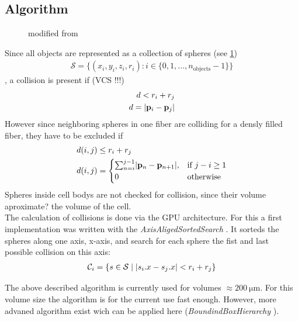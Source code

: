 \subsection{Algorithm}
% 
\begin{figure}[!t]
\centering
\def\tikzwidth{0.75\textwidth}
\caption{modified from \cite{Ginsburger2019}}
\label{fig:model:medusa_4}
\end{figure}
%
% 
Since all objects are represented as a collection of spheres (see \cref{fig:model:medusa_4})
\begin{align}
    \mathcal{S} = \{ (x_i,y_i,z_i,r_i) : i \in \{0, 1, ..., n_\text{objects}-1\}  \} 
\end{align}
% 
, a collision is present if (VCS !!!)
% 
\begin{align}
\begin{split}
d<r_i+r_j\\
d = \lvert\mathbf{p}_i - \mathbf{p}_j\rvert
\end{split}
\end{align}
% 
However since neighboring spheres in one fiber are colliding for a densly filled fiber, they have to be excluded if
\begin{align}
\begin{split}
d(i,j) &\leq  r_i + r_j\\
d(i,j) &= 
\begin{cases}
\sum_{n=i}^{j-1} \lvert\mathbf{p}_n - \mathbf{p}_{n+1}\rvert,& \text{if } j-i \geq 1\\
0 & \text{otherwise}
\end{cases}
\end{split}
\end{align}
% 
Spheres inside cell bodys are not checked for collision, since their volume aproximate? the volume of the cell.\\
% 
The calculation of collisions is done via the GPU architecture. For this a first implementation was written with the \textit{AxisAligedSortedSearch} \cite{Karras2012}. It sorteds the spheres along one axis, \eg x-axis, and search for each sphere the fist and last possible collision on this axis:
\begin{align}
\begin{split}
\mathcal{C}_i = \{ s \in \mathcal{S} \mid \lvert s_i.x - s_j.x\rvert < r_i+r_j \}
\end{split}
\end{align}
% 
\begin{lstfloat}[!t]
	
	\caption{Pseudocode of \acs{MEDUSA} collision checking.}
	\label{alg:medusa_collision}
\end{lstfloat}
% 
The above described algorithm is currently used for volumes $\approx \SI{200}{\micro\meter}$. For this volume size the algorithm is for the current use fast enough. However, more advaned algorithm exist wich can be applied here (\eg \textit{BoundindBoxHierarchy} \cite{Karras2012}).
% 

